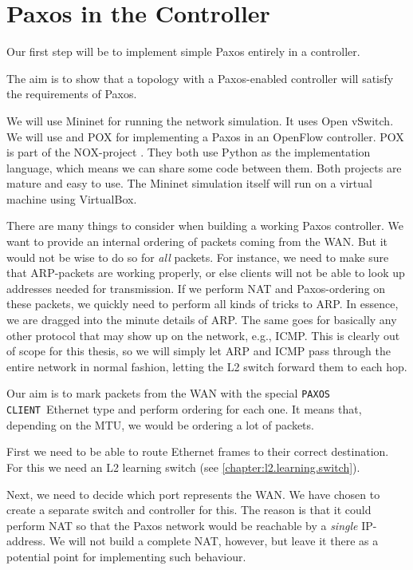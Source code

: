 \section{Paxos in the Controller}

Our first step will be to implement simple Paxos \cite{Lam01} entirely in a
controller.

The aim is to show that a topology with a Paxos-enabled controller will
satisfy the requirements of Paxos.

We will use Mininet \cite{Lantz:2010:NLR:1868447.1868466} for
running the network simulation.  It uses Open vSwitch.
We will use and POX \cite{POX.1} for
implementing a Paxos in an OpenFlow controller.  POX is part of the
NOX-project \cite{Gude:2008:NTO:1384609.1384625}.
%
They both use Python
\cite{vanRossum:2009:PRM:1610526} as the implementation language, which
means we can share some code between them.  Both projects are mature and
easy to use.  The Mininet simulation itself will run on a virtual machine
using VirtualBox.

There are many things to consider when building a working Paxos controller.
We want to provide an internal ordering of packets coming from the \ac{WAN}.
But it would not be wise to do so for \textit{all} packets. For instance, we
need to make sure that \ac{ARP}-packets are working properly, or else
clients will not be able to look up addresses needed for transmission.
If we perform \ac{NAT} and Paxos-ordering on these packets, we quickly need
to perform all kinds of tricks to \acs{ARP}.  In essence, we are dragged
into the minute details of \acs{ARP}.  The same goes for basically any other
protocol that may show up on the network, e.g., \ac{ICMP}.
%
This is clearly out of scope for this
thesis, so we will simply let \acs{ARP} and \acs{ICMP} pass through the
entire network in normal fashion, letting the \acs{L2} switch forward them
to each hop.

Our aim is to mark packets from the \ac{WAN} with the special
\texttt{PAXOS CLIENT} Ethernet type and perform ordering for each one.
It means that, depending on the \ac{MTU}, we would be ordering a lot of
packets.

First we need to be able to route Ethernet frames to their correct
destination. For this we need an \ac{L2} learning switch (see
    \vref{chapter:l2.learning.switch}).

Next, we need to decide which port represents the \ac{WAN}.
We have chosen to create a separate switch and controller for this.
The reason is that it could perform \acf{NAT} so that the Paxos network
would be reachable by a \textit{single} \acs{IP}-address.
We will not build a complete \acs{NAT}, however, but leave it there as a
potential point for implementing such behaviour.

